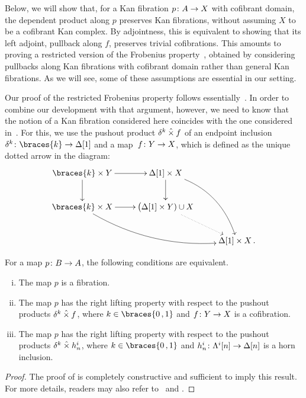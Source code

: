 \documentclass[reqno,10pt,a4paper,oneside,draft]{amsart}
\begin{document}
Below, we will show that, for a Kan fibration $p \colon A \rightarrow X$ with cofibrant domain, the dependent product along $p$ preserves Kan fibrations, without assuming $X$ to be a cofibrant Kan complex. By adjointness, this is equivalent to showing that its left adjoint, \ie 
 pullback along $f$, preserves trivial cofibrations. This amounts to proving a restricted version of the Frobenius property~\cite{BergB:topsmi}, obtained by considering pullbacks along Kan fibrations with
cofibrant domain rather than general Kan fibrations. As we will see, some of these assumptions are essential in our
setting.  

Our proof of the restricted Frobenius property follows essentially~\cite{gambino2017frobenius}. 
In order to combine our development with that argument, however, we need to know that the notion of a Kan fibration considered here coincides with the one considered in~\cite[Definition~4.1]{gambino2017frobenius}. For this, 
we use the pushout product $\delta^k \mathbin{\hat{\times}} f$ of an endpoint inclusion $\kcyl \co \braces{ k } \to \Delta[1]$ and a map~$f \colon Y \to X$, which is defined as the unique dotted arrow  in the diagram:
\[
\xymatrix{
\braces{ k } \times Y \ar[r] \ar[d] &  \Delta[1]  \times X  \ar[d] \ar@/^1.5pc/[ddr] \\
\braces{ k} \times X \ar[r]  \ar@/_1.5pc/[drr] & \big( \Delta[1] \times Y ) \cup X \ar@{.>}[dr]  \\
 & &\Delta[1] \times  X \, .}
 \]



\begin{proposition} For a map $p \colon B \to A$, the following conditions are equivalent.
\begin{enumerate}[(i)] 
\item The map $p$ is a fibration.
\item The map $p$ has the right lifting property with respect to the pushout products 
$\delta^k  \mathbin{\hat{\times}} f$, where $k \in \braces{ 0 \, , 1 }$ and $f \colon Y \to X$ is a cofibration.
\item The map $p$ has the right lifting property with respect to the pushout products $\delta^k  \mathbin{\hat{\times}} h_n^i$, 
where $k \in \braces{ 0 \, , 1 }$ and $h_n^i \colon \Lambda^i[n] \to \Delta[n]$  is a horn inclusion.
\end{enumerate}
\end{proposition} 

\begin{proof}The proof of \cite[Theorem~3.2.3]{joyal-tierney:simplicial-homotopy-theory} is completely constructive and sufficient to imply this result.
For more details, readers may also refer to~\cite[Corollary~5.3.2]{henry2018wms}
and \cite[Proposition~5.2.6]{henry2018wms}.
\end{proof}
\end{document}
